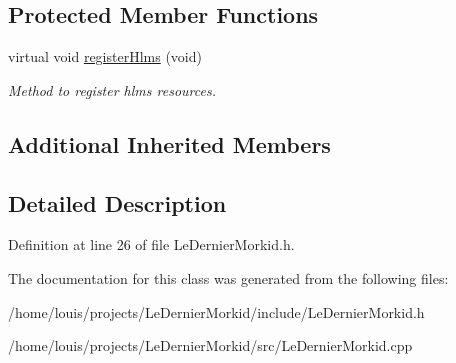 \subsection*{Protected Member Functions}
\begin{DoxyCompactItemize}
\item 
\mbox{\label{class_le_dernier_morkid_graphics_system_a3956ef81965b84ec80e1069050cf9c44}} 
virtual void \hyperlink{class_le_dernier_morkid_graphics_system_a3956ef81965b84ec80e1069050cf9c44}{register\+Hlms} (void)
\begin{DoxyCompactList}\small\item\em Method to register hlms resources. \end{DoxyCompactList}\end{DoxyCompactItemize}
\subsection*{Additional Inherited Members}


\subsection{Detailed Description}


Definition at line 26 of file Le\+Dernier\+Morkid.\+h.



The documentation for this class was generated from the following files\+:\begin{DoxyCompactItemize}
\item 
/home/louis/projects/\+Le\+Dernier\+Morkid/include/Le\+Dernier\+Morkid.\+h\item 
/home/louis/projects/\+Le\+Dernier\+Morkid/src/Le\+Dernier\+Morkid.\+cpp\end{DoxyCompactItemize}
